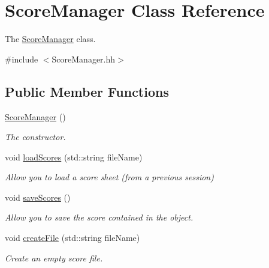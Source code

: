 \hypertarget{classScoreManager}{}\section{Score\+Manager Class Reference}
\label{classScoreManager}


The \hyperlink{classScoreManager}{Score\+Manager} class.  




{\ttfamily \#include $<$Score\+Manager.\+hh$>$}

\subsection*{Public Member Functions}
\begin{DoxyCompactItemize}
\item 
\mbox{\label{classScoreManager_a4f3866ff832127664543349da5c4fbf4}} 
\hyperlink{classScoreManager_a4f3866ff832127664543349da5c4fbf4}{Score\+Manager} ()
\begin{DoxyCompactList}\small\item\em The constructor. \end{DoxyCompactList}\item 
void \hyperlink{classScoreManager_a4c345e9d06ef6f7fb937c43fa51dddd5}{load\+Scores} (std\+::string file\+Name)
\begin{DoxyCompactList}\small\item\em Allow you to load a score sheet (from a previous session) \end{DoxyCompactList}\item 
\mbox{\label{classScoreManager_a2cbb9e5e0f1062aecb034157b05defa2}} 
void \hyperlink{classScoreManager_a2cbb9e5e0f1062aecb034157b05defa2}{save\+Scores} ()
\begin{DoxyCompactList}\small\item\em Allow you to save the score contained in the object. \end{DoxyCompactList}\item 
void \hyperlink{classScoreManager_abbe17770ef85b2575fd14acf90a0bc9f}{create\+File} (std\+::string file\+Name)
\begin{DoxyCompactList}\small\item\em Create an empty score file. \end{DoxyCompactList}\item 

\end{DoxyCompactItemize}
